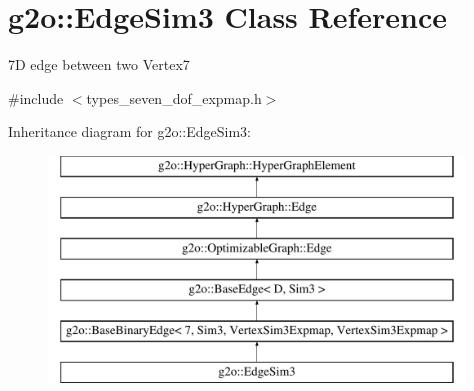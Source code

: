 \hypertarget{classg2o_1_1_edge_sim3}{}\section{g2o\+:\+:Edge\+Sim3 Class Reference}
\label{classg2o_1_1_edge_sim3}


7D edge between two Vertex7  




{\ttfamily \#include $<$types\+\_\+seven\+\_\+dof\+\_\+expmap.\+h$>$}

Inheritance diagram for g2o\+:\+:Edge\+Sim3\+:\begin{figure}[H]
\begin{center}
\leavevmode
\includegraphics[height=6.000000cm]{classg2o_1_1_edge_sim3}
\end{center}
\end{figure}
